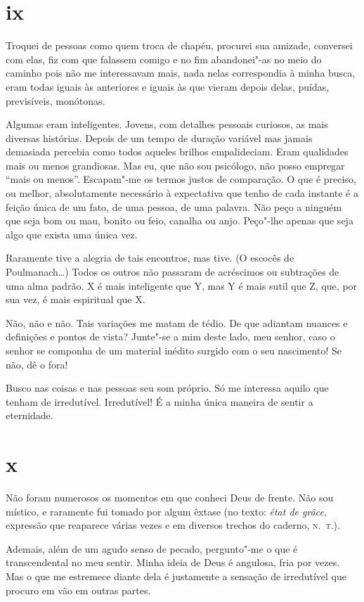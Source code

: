 \section{ix}

Troquei de pessoas como quem troca de chapéu, procurei sua amizade,
conversei com elas, fiz com que falassem comigo e no fim abandonei"-as
no meio do caminho pois não me interessavam mais, nada nelas
correspondia à minha busca, eram todas iguais às anteriores e
iguais às que vieram depois delas, puídas, previsíveis, monótonas.

Algumas eram inteligentes. Jovens, com detalhes pessoais curiosos,
as mais diversas histórias. Depois de um tempo de duração variável
mas jamais demasiada percebia como todos aqueles brilhos
empalideciam. Eram qualidades mais ou menos grandiosas. Mas eu, que não
sou psicólogo, não posso empregar ``mais ou menos''. Escapam"-me os
termos justos de comparação. O que é preciso, ou melhor,
absolutamente necessário à expectativa que tenho de cada instante é a
feição única de um fato, de uma pessoa, de uma palavra. Não peço a
ninguém que seja bom ou mau, bonito ou feio, canalha ou anjo. Peço"-lhe
apenas que seja algo que exista uma única vez.

Raramente tive a alegria de tais encontros, mas tive. (O escocês de
Poulmanach\ldots{}) Todos os outros não passaram de acréscimos ou
subtrações de uma alma padrão. X é mais inteligente que Y, mas Y é mais
sutil que Z, que, por sua vez, é mais espiritual que X.

Não, não e não. Tais variações me matam de tédio. De que adiantam
nuances e definições e pontos de vista? Junte"-se a mim deste lado, meu
senhor, caso o senhor se componha de um material inédito surgido com o
seu nascimento! Se não, dê o fora!

Busco nas coisas e nas pessoas seu som próprio. Só me interessa aquilo
que tenham de irredutível. Irredutível! É a minha única maneira de
sentir a eternidade.

\section{x}

Não foram numerosos os momentos em que conheci Deus de frente. Não sou
místico, e raramente fui tomado por algum êxtase (no texto: \emph{état
de grâce}, expressão que reaparece várias vezes e em diversos trechos do
caderno, \textsc{n.~t.}).

Ademais, além de um agudo senso de pecado, pergunto"-me o que é
transcendental no meu sentir. Minha ideia de Deus é angulosa, fria por
vezes. Mas o que me estremece diante dela é justamente a sensação de
irredutível que procuro em vão em outras partes.

